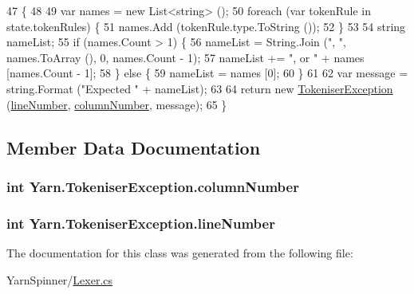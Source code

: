\begin{DoxyCode}
47                                                                                                            
                       \{
48 
49             var names = \textcolor{keyword}{new} List<string> ();
50             \textcolor{keywordflow}{foreach} (var tokenRule \textcolor{keywordflow}{in} state.tokenRules) \{
51                 names.Add (tokenRule.type.ToString ());
52             \}
53 
54             \textcolor{keywordtype}{string} nameList;
55             \textcolor{keywordflow}{if} (names.Count > 1) \{
56                 nameList = String.Join (\textcolor{stringliteral}{", "}, names.ToArray (), 0, names.Count - 1);
57                 nameList += \textcolor{stringliteral}{", or "} + names [names.Count - 1];
58             \} \textcolor{keywordflow}{else} \{
59                 nameList = names [0];
60             \}
61 
62             var message = string.Format (\textcolor{stringliteral}{"Expected "} + nameList);
63             
64             \textcolor{keywordflow}{return} \textcolor{keyword}{new} \hyperlink{a00094_ad00fcf742d2b0d476ce43b27a3f3b6c1}{TokeniserException} (\hyperlink{a00094_a54b936d7b4f26f88a07a66c5fc1d1ad1}{lineNumber}, 
      \hyperlink{a00094_aabf2ad38f3984297c1daede9be55e3d6}{columnNumber}, message);
65         \}
\end{DoxyCode}


\subsection{Member Data Documentation}
\hypertarget{a00094_aabf2ad38f3984297c1daede9be55e3d6}{
\subsubsection[{column\-Number}]{\setlength{\rightskip}{0pt plus 5cm}int Yarn.\-Tokeniser\-Exception.\-column\-Number}}\label{a00094_aabf2ad38f3984297c1daede9be55e3d6}
\hypertarget{a00094_a54b936d7b4f26f88a07a66c5fc1d1ad1}{
\subsubsection[{line\-Number}]{\setlength{\rightskip}{0pt plus 5cm}int Yarn.\-Tokeniser\-Exception.\-line\-Number}}\label{a00094_a54b936d7b4f26f88a07a66c5fc1d1ad1}


The documentation for this class was generated from the following file\-:\begin{DoxyCompactItemize}
\item 
Yarn\-Spinner/\hyperlink{a00140}{Lexer.\-cs}\end{DoxyCompactItemize}
